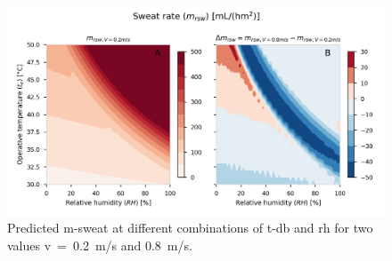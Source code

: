 \begin{figure}[hbt!]
    \centering
    \includegraphics[width=\textwidth]{figures/sweat_rate}
    \caption{Predicted \acf{m-sweat} at different combinations of \acf{t-db} and \acf{rh} for two values \acf{v}~=~0.2~m/s and 0.8~m/s.}
    \label{fig:sweat_rate}
\end{figure}